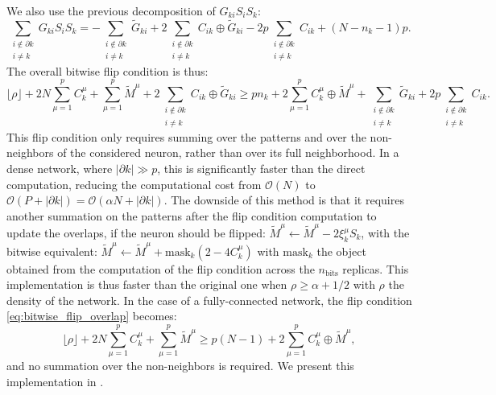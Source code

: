 We also use the previous decomposition of $G_{ki} S_i S_k$:
\begin{equation*}
    \sum_{\substack{i \notin \partial k \\ i \neq k}} G_{ki} S_i S_k= -
    \sum_{\substack{i \notin \partial k \\ i \neq k}} \tilde{G}_{ki} +
  2 \sum_{\substack{i \notin \partial k \\ i \neq k}} C_{ik} \oplus \tilde{G}_{ki} - 2p
    \sum_{\substack{i \notin \partial k \\ i \neq k}} C_{ik}
    +(N-n_k-1)p.
\end{equation*}
The overall bitwise flip condition is thus:
\begin{equation}
    \lfloor \rho \rfloor + 2N \sum_{\mu=1}^p C_k^\mu +  \sum_{\mu=1}^p \tilde{M}^\mu +   2 \sum_{\substack{i \notin \partial k \\ i \neq k}} C_{ik} \oplus \tilde{G}_{ki} \geq  p n_k + 2 \sum_{\mu=1}^p C_k^\mu \oplus \tilde{M}^\mu +\sum_{\substack{i \notin \partial k \\ i \neq k}} \tilde{G}_{ki} + 2p \sum_{\substack{i \notin \partial k \\ i \neq k}} C_{ik}.
    \label{eq:bitwise_flip_overlap}
\end{equation}
This flip condition only requires summing over the patterns and over the non-neighbors of the considered neuron, rather than over its full neighborhood. In a dense network, where $|\partial k| \gg p$, this is significantly faster than the direct computation, reducing the computational cost from $\mathcal{O}(N)$ to $\mathcal{O}(P+ |\partial k|)=\mathcal{O}(\alpha N+ |\partial k|)$. The downside of this method is that it requires another summation on the patterns after the flip condition computation to update the overlaps, if the neuron should be flipped: $\tilde{M}^\mu \leftarrow \tilde{M}^\mu - 2 \xi_k^\mu S_k$, with the bitwise equivalent: $\tilde{M}^\mu \leftarrow \tilde{M}^\mu + \text{mask}_k (2-4C_k^\mu)$ with $\text{mask}_k$ the \Bits object obtained from the computation of the flip condition across the $n_\text{bits}$ replicas. This implementation is thus faster than the original one when $\rho \geq \alpha + 1/2$ with $\rho$ the density of the network.
In the case of a fully-connected network, the flip condition \eqref{eq:bitwise_flip_overlap} becomes:
\begin{equation}
    \lfloor \rho \rfloor + 2N \sum_{\mu=1}^p C_k^\mu +  \sum_{\mu=1}^p \tilde{M}^\mu \geq  p (N-1) + 2 \sum_{\mu=1}^p C_k^\mu \oplus \tilde{M}^\mu,
    \label{eq:bitwise_flip_overlap_FC}
\end{equation}
and no summation over the non-neighbors is required. We present this implementation in .

